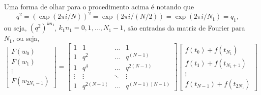 Uma forma de olhar para o procedimento acima é notando que
\begin{dmath*}
  q^2 = \left( \exp(2 \pi i / N) \right)^2
  = \exp(2 \pi i / (N / 2))
  = \exp(2 \pi i / N_1)
  = q_1,
\end{dmath*}
ou seja, $(q^2)^{k n_1}$, $k_1 n_1 = 0, 1, \ldots, N_1 - 1$, são entradas da
matriz de Fourier para $N_1$, ou seja,
\begin{dmath*}
  \begin{bmatrix}
    F(w_0) \\
    F(w_1) \\
    \vdots \\
    F(w_{2 N_1 - 1})
  \end{bmatrix} =  \begin{bmatrix}
    1 & 1 & \ldots & 1 \\
    1 & q^{2} & \ldots & q^{(N - 1)} \\
    1 & q^{4} & \ldots & q^{2(N - 1)} \\
    \vdots & \vdots & \ddots & \vdots \\
    1 & q^{2 (N - 1)} & \ldots & q^{(N - 1)(N - 1)}
  \end{bmatrix} \begin{bmatrix}
    f(t_0) + f(t_{N_1}) \\
    f(t_1) + f(t_{N_1 + 1})\\
    \vdots \\
    f(t_{N - 1}) + f(t_{2 N_1})
  \end{bmatrix}
\end{dmath*}

